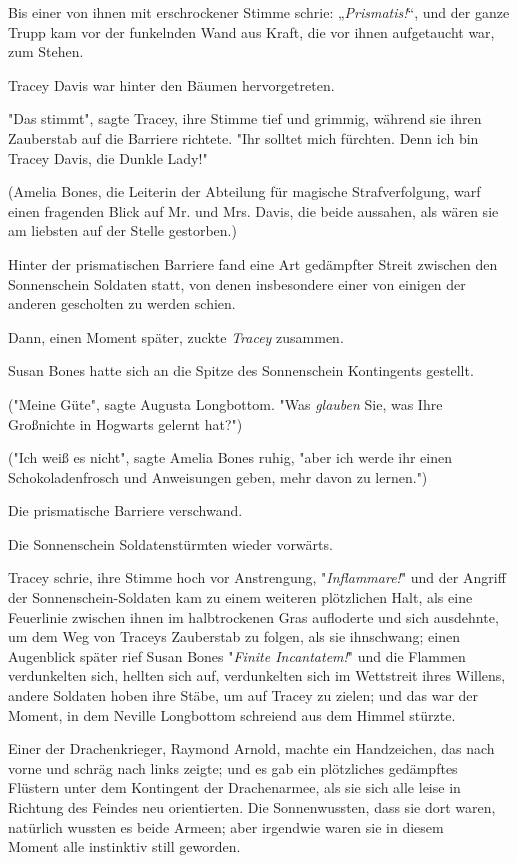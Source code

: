 {Bis einer von ihnen mit erschrockener Stimme schrie: „\emph{Prismatis!}“, und der ganze Trupp kam vor der funkelnden Wand aus Kraft, die vor ihnen aufgetaucht war, zum Stehen.

Tracey Davis war hinter den Bäumen hervorgetreten.

"Das stimmt", sagte Tracey, ihre Stimme tief und grimmig, während sie ihren Zauberstab auf die Barriere richtete. "Ihr solltet mich fürchten. Denn ich bin Tracey Davis, die Dunkle Lady!"

(Amelia Bones, die Leiterin der Abteilung für magische Strafverfolgung, warf einen fragenden Blick auf Mr. und Mrs. Davis, die beide aussahen, als wären sie am liebsten auf der Stelle gestorben.)

Hinter der prismatischen Barriere fand eine Art gedämpfter Streit zwischen den Sonnenschein Soldaten statt, von denen insbesondere einer von einigen der anderen gescholten zu werden schien.

Dann, einen Moment später, zuckte \emph{Tracey} zusammen.

Susan Bones hatte sich an die Spitze des Sonnenschein Kontingents gestellt.

("Meine Güte", sagte Augusta Longbottom. "Was \emph{glauben} Sie, was Ihre Großnichte in Hogwarts gelernt hat?")

("Ich weiß es nicht", sagte Amelia Bones ruhig, "aber ich werde ihr einen Schokoladenfrosch und Anweisungen geben, mehr davon zu lernen.")

Die prismatische Barriere verschwand.

Die Sonnenschein Soldatenstürmten wieder vorwärts.

Tracey schrie, ihre Stimme hoch vor Anstrengung, "\emph{Inflammare!}" und der Angriff der Sonnenschein-Soldaten kam zu einem weiteren plötzlichen Halt, als eine Feuerlinie zwischen ihnen im halbtrockenen Gras aufloderte und sich ausdehnte, um dem Weg von Traceys Zauberstab zu folgen, als sie ihnschwang; einen Augenblick später rief Susan Bones "\emph{Finite Incantatem!}" und die Flammen verdunkelten sich, hellten sich auf, verdunkelten sich im Wettstreit ihres Willens, andere Soldaten hoben ihre Stäbe, um auf Tracey zu zielen; und das war der Moment, in dem Neville Longbottom schreiend aus dem Himmel stürzte.

Einer der Drachenkrieger, Raymond Arnold, machte ein Handzeichen, das nach vorne und schräg nach links zeigte; und es gab ein plötzliches gedämpftes Flüstern unter dem Kontingent der Drachenarmee, als sie sich alle leise in Richtung des Feindes neu orientierten. Die Sonnenwussten, dass sie dort waren, natürlich wussten es beide Armeen; aber irgendwie waren sie in diesem\\ Moment alle instinktiv still geworden.

}
